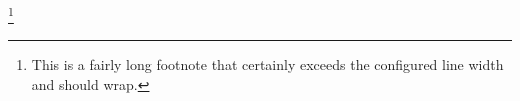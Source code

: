\footnote{This is a fairly long footnote
that certainly exceeds the configured
line width and should wrap.}
